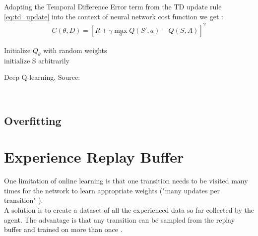Adapting the Temporal Difference Error term from the TD update rule \ref{eq:td_update} into the context of neural network cost function we get \cite{lecture_intro_to_deep_rl}:
\begin{align}
    C(\theta, D) = [R + \gamma \max_a Q(S', a) - Q(S, A)]^2
\end{align}

\begin{algorithm}[H]
\SetAlgoLined
Initialize $Q_{\theta}$ with random weights \theta \; \\
initialize S arbitrarily\;\\
\caption{Deep Q-learning. Source: \cite{lecture_dqn} }
\end{algorithm}\\

\subsection{Overfitting}

\section{Experience Replay Buffer}

One limitation of online learning is that one transition needs to be visited many times for the network to learn appropriate weights ("many updates per transition" \cite{lecture_dqn}). \\

A solution is to create a dataset of all the experienced data so far collected by the agent. The advantage is that any transition can be sampled from the replay buffer and trained on more than once \cite{lecture_dqn}. 

